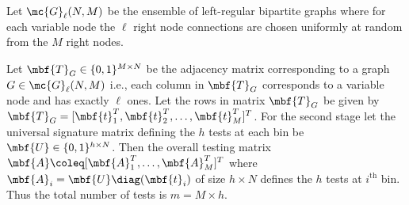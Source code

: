 \documentclass[conference,twocolumn]{IEEEtran}
\begin{document}
\begin{definition}
Let $\mc{G}_{\ell}(N,M)$ be the ensemble of left-regular bipartite graphs where for each variable node the $\ell$ right node connections are chosen uniformly at random from the $M$ right nodes.
\end{definition}

Let $\mbf{T}_{G}\in\{0,1\}^{M\times N }$ be the adjacency matrix corresponding to a graph $G\in\mc{G}_{\ell}(N,M)$ i.e., each column in $\mbf{T}_{G}$ corresponds to a variable node and has exactly $\ell$ ones. Let the rows in matrix $\mbf{T}_{G}$ be given by $\mbf{T}_{G}=[\mbf{t}^{T}_1,\mbf{t}^{T}_{2},\dots, \mbf{t}^{T}_{M}]^{T}$. For the second stage let the universal signature matrix defining the $h$ tests at each bin be $\mbf{U}\in\{0,1\}^{h\times N}$. Then the overall testing matrix $\mbf{A}\coleq [\mbf{A}_{1}^{T},\ldots,\mbf{A}_{M}^{T}]^T$ where $\mbf{A}_{i}=\mbf{U} \diag (\mbf{t}_i)$ of size $h\times N$ defines the $h$ tests at $i^{\text{th}}$ bin. Thus the total number of tests is $m=M\times h$.

 
\end{document}
